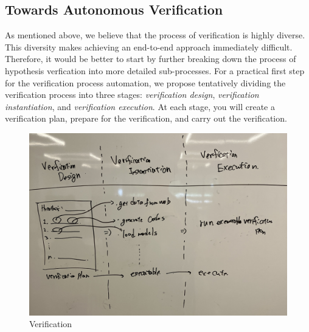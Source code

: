 \documentclass{book}
\begin{document}


\subsection{Towards Autonomous Verification}

As mentioned above, we believe that the process of verification is highly diverse. This diversity makes achieving an end-to-end approach immediately difficult. Therefore, it would be better to start by further breaking down the process of hypothesis verfication into more detailed sub-processes. For a practical first step for the verification process automation, we propose tentatively dividing the verification process into three stages: \textit{verification design}, \textit{verification instantiation}, and \textit{verification execution}. At each stage, you will create a verification plan, prepare for the verification, and carry out the verification.

\begin{figure}[htb]
    \centering
    \includegraphics[width=\textwidth]{figs/verification.jpg}
    \caption{Verification}
    \label{fig:verification}
\end{figure}
\end{document}
